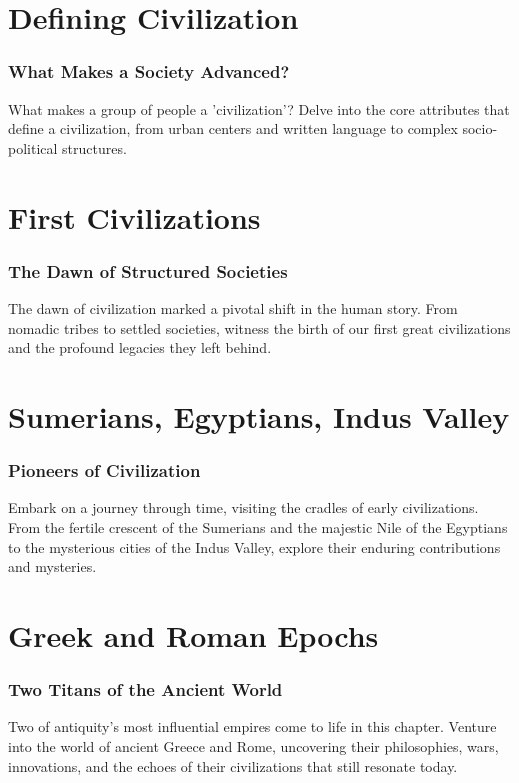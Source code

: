 \documentclass[a4paper,12pt]{book}
\begin{document}
\chapter{Defining Civilization}
\subsection*{What Makes a Society Advanced?}
What makes a group of people a 'civilization'? Delve into the core attributes that define a civilization, from urban centers and written language to complex socio-political structures.

\chapter{First Civilizations}
\subsection*{The Dawn of Structured Societies}
The dawn of civilization marked a pivotal shift in the human story. From nomadic tribes to settled societies, witness the birth of our first great civilizations and the profound legacies they left behind.

\chapter{Sumerians, Egyptians, Indus Valley}
\subsection*{Pioneers of Civilization}
Embark on a journey through time, visiting the cradles of early civilizations. From the fertile crescent of the Sumerians and the majestic Nile of the Egyptians to the mysterious cities of the Indus Valley, explore their enduring contributions and mysteries.

\chapter{Greek and Roman Epochs}
\subsection*{Two Titans of the Ancient World}
Two of antiquity's most influential empires come to life in this chapter. Venture into the world of ancient Greece and Rome, uncovering their philosophies, wars, innovations, and the echoes of their civilizations that still resonate today.
\end{document}
